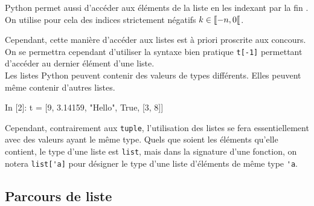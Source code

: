 \documentclass{magnoliaold}
\begin{document}
Python permet aussi d'accéder aux éléments de la liste en les indexant \og par la fin \fg. On utilise
pour cela des indices strictement négatifs $k\in\left\llbracket -n,0\right\llbracket$.
\begin{center}
\end{center}
Cependant, cette manière d'accéder aux listes est à priori proscrite aux concours. On se permettra
cependant d'utiliser la syntaxe bien pratique \verb!t[-1]! permettant d'accéder au dernier
élément d'une liste.\\

Les listes Python peuvent contenir des valeurs de types différents. Elles peuvent même contenir d'autres listes.

\begin{pythoncode}
In [2]: t = [9, 3.14159, "Hello", True, [3, 8]]
\end{pythoncode}

\noindent
Cependant, contrairement aux \verb_tuple_, l'utilisation des listes se fera essentiellement
avec des valeurs ayant le même type. Quels que soient les éléments qu'elle contient, le type d'une
liste est \verb!list!, mais dans la signature d'une fonction, on notera \verb!list['a]! pour désigner
le type d'une liste d'éléments de même type \verb!'a!.

\subsection{Parcours de liste}
\end{document}
